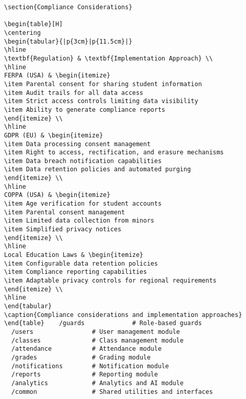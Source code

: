 \documentclass[11pt]{report}
\begin{document}
\begin{verbatim}
\section{Compliance Considerations}

\begin{table}[H]
\centering
\begin{tabular}{|p{3cm}|p{11.5cm}|}
\hline
\textbf{Regulation} & \textbf{Implementation Approach} \\
\hline
FERPA (USA) & \begin{itemize}
\item Parental consent for sharing student information
\item Audit trails for all data access
\item Strict access controls limiting data visibility
\item Ability to generate compliance reports
\end{itemize} \\
\hline
GDPR (EU) & \begin{itemize}
\item Data processing consent management
\item Right to access, rectification, and erasure mechanisms
\item Data breach notification capabilities
\item Data retention policies and automated purging
\end{itemize} \\
\hline
COPPA (USA) & \begin{itemize}
\item Age verification for student accounts
\item Parental consent management
\item Limited data collection from minors
\item Simplified privacy notices
\end{itemize} \\
\hline
Local Education Laws & \begin{itemize}
\item Configurable data retention policies
\item Compliance reporting capabilities
\item Adaptable privacy controls for regional requirements
\end{itemize} \\
\hline
\end{tabular}
\caption{Compliance considerations and implementation approaches}
\end{table}    /guards             # Role-based guards
  /users                # User management module
  /classes              # Class management module
  /attendance           # Attendance module
  /grades               # Grading module
  /notifications        # Notification module
  /reports              # Reporting module
  /analytics            # Analytics and AI module
  /common               # Shared utilities and interfaces
\end{verbatim}
\end{document}
